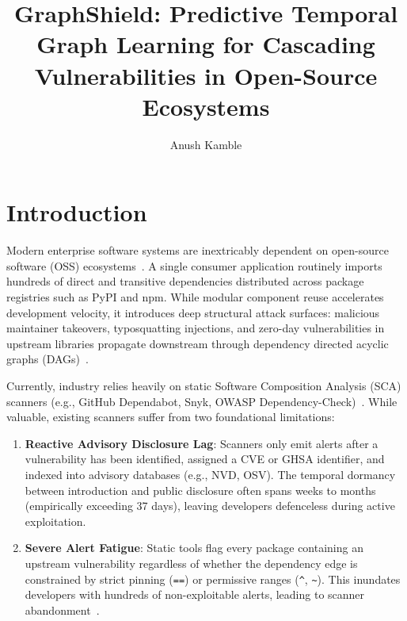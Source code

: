 \documentclass[sigconf,screen]{acmart}
\title{GraphShield: Predictive Temporal Graph Learning for Cascading Vulnerabilities in Open-Source Ecosystems}
\author{Anush Kamble}
\affiliation{%
  \institution{National Institute of Technology Warangal}
  \city{Warangal}
  \state{Telangana}
  \country{India}
}
\begin{document}
\maketitle

\section{Introduction}
\label{sec:intro}

Modern enterprise software systems are inextricably dependent on open-source software (OSS) ecosystems~\cite{zimmermann2019small, decan2019package}. A single consumer application routinely imports hundreds of direct and transitive dependencies distributed across package registries such as PyPI and npm. While modular component reuse accelerates development velocity, it introduces deep structural attack surfaces: malicious maintainer takeovers, typosquatting injections, and zero-day vulnerabilities in upstream libraries propagate downstream through dependency directed acyclic graphs (DAGs)~\cite{ladisa2023soK, ohm2020backstabber}.

Currently, industry relies heavily on static Software Composition Analysis (SCA) scanners (e.g., GitHub Dependabot, Snyk, OWASP Dependency-Check)~\cite{alfadel2021empirical, pashchenko2020qualitative}. While valuable, existing scanners suffer from two foundational limitations:
\begin{enumerate}
    \item \textbf{Reactive Advisory Disclosure Lag}: Scanners only emit alerts after a vulnerability has been identified, assigned a CVE or GHSA identifier, and indexed into advisory databases (e.g., NVD, OSV). The temporal dormancy between introduction and public disclosure often spans weeks to months (empirically exceeding 37 days), leaving developers defenceless during active exploitation.
    \item \textbf{Severe Alert Fatigue}: Static tools flag every package containing an upstream vulnerability regardless of whether the dependency edge is constrained by strict pinning (\texttt{==}) or permissive ranges (\texttt{\^{}}, \texttt{\~{}}). This inundates developers with hundreds of non-exploitable alerts, leading to scanner abandonment~\cite{mirhosseini2017can, wessel2018power}.
\end{enumerate}
\end{document}
